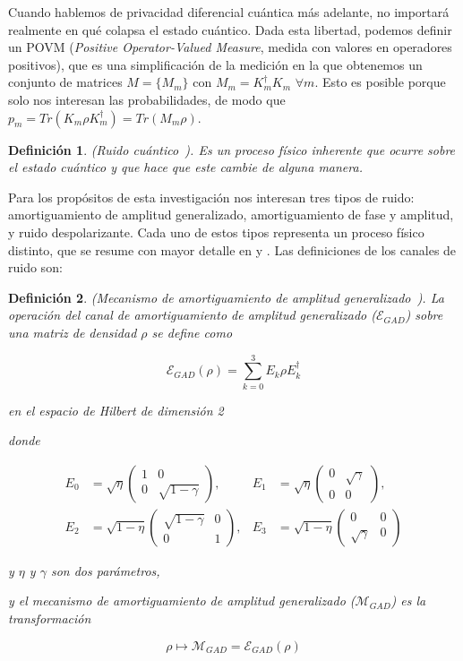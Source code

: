 \documentclass{ieeeaccess}
\newtheorem{definition}{Definición}[section]
\begin{document}
Cuando hablemos de privacidad diferencial cuántica más adelante, no importará realmente en qué colapsa el estado cuántico. Dada esta libertad, podemos definir un POVM (\textit{Positive Operator-Valued Measure}, medida con valores en operadores positivos), que es una simplificación de la medición en la que obtenemos un conjunto de matrices $M = \{M_m\}$ con $M_m = K^{\dagger}_{m}K_{m}$ $\forall m$. Esto es posible porque solo nos interesan las probabilidades, de modo que $p_m = Tr(K_{m} \rho K^{\dagger}_{m}) = Tr(M_m\rho)$.

\begin{definition}
    (Ruido cuántico~\cite{zhou2017differential}). Es un proceso físico inherente que ocurre sobre el estado cuántico y que hace que este cambie de alguna manera.
    \label{def:quantum_noise}
\end{definition}

Para los propósitos de esta investigación nos interesan tres tipos de ruido: amortiguamiento de amplitud generalizado, amortiguamiento de fase y amplitud, y ruido despolarizante. Cada uno de estos tipos representa un proceso físico distinto, que se resume con mayor detalle en \cite{song2025hybrid} y \cite{zhou2017differential}. Las definiciones de los canales de ruido son:

\begin{definition}
    (Mecanismo de amortiguamiento de amplitud generalizado~\cite{zhou2017differential}). La operación del canal de amortiguamiento de amplitud generalizado ($\mathcal{E}_{GAD}$) sobre una matriz de densidad $\rho$ se define como

    \[
      \mathcal{E}_{GAD}(\rho) = \sum_{k = 0}^{3}E_{k}\rho E_{k}^{\dagger}
    \]

    en el espacio de Hilbert de dimensión 2

    donde

    \begin{align*}
      E_0 &= \sqrt{\eta}\begin{pmatrix} 1 & 0 \\ 0 & \sqrt{1-\gamma} \end{pmatrix}, &
      E_1 &= \sqrt{\eta}\begin{pmatrix} 0 & \sqrt{\gamma} \\ 0 & 0 \end{pmatrix}, \\
      E_2 &= \sqrt{1-\eta}\begin{pmatrix} \sqrt{1-\gamma} & 0 \\ 0 & 1 \end{pmatrix}, &
      E_3 &= \sqrt{1-\eta}\begin{pmatrix} 0 & 0 \\ \sqrt{\gamma} & 0 \end{pmatrix}
    \end{align*}

    y $\eta$ y $\gamma$ son dos parámetros,

    y el mecanismo de amortiguamiento de amplitud generalizado ($\mathcal{M}_{GAD}$) es la transformación

    \[
      \rho \mapsto \mathcal{M}_{GAD} = \mathcal{E}_{GAD}(\rho)
    \]
    \label{def:gad}
\end{definition}
\end{document}
